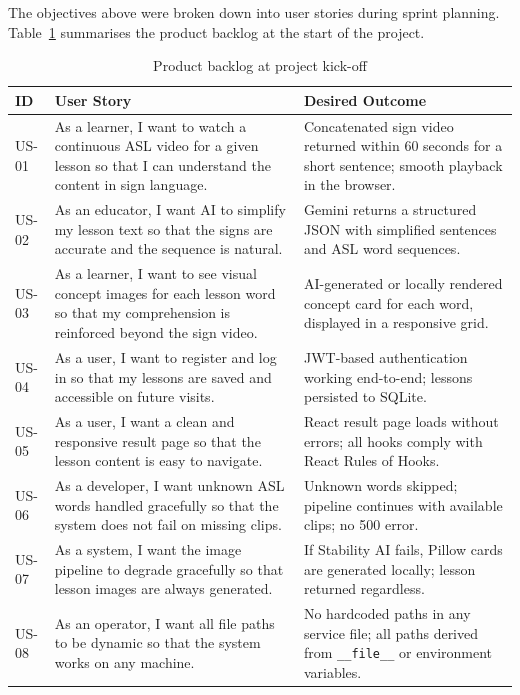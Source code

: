 \documentclass[12pt,a4paper,oneside]{report}
\begin{document}
The objectives above were broken down into user stories during sprint planning. Table~\ref{tab:backlog} summarises the product backlog at the start of the project.

\begin{table}[h]
\caption{Product backlog at project kick-off}
\label{tab:backlog}
\centering
\small
\begin{tabularx}{\linewidth}{@{}lXX@{}}
\toprule
\textbf{ID} & \textbf{User Story} & \textbf{Desired Outcome} \\
\midrule
US-01 & As a learner, I want to watch a continuous ASL video for a given lesson so that I can understand the content in sign language. & Concatenated sign video returned within 60 seconds for a short sentence; smooth playback in the browser. \\
US-02 & As an educator, I want AI to simplify my lesson text so that the signs are accurate and the sequence is natural. & Gemini returns a structured JSON with simplified sentences and ASL word sequences. \\
US-03 & As a learner, I want to see visual concept images for each lesson word so that my comprehension is reinforced beyond the sign video. & AI-generated or locally rendered concept card for each word, displayed in a responsive grid. \\
US-04 & As a user, I want to register and log in so that my lessons are saved and accessible on future visits. & JWT-based authentication working end-to-end; lessons persisted to SQLite. \\
US-05 & As a user, I want a clean and responsive result page so that the lesson content is easy to navigate. & React result page loads without errors; all hooks comply with React Rules of Hooks. \\
US-06 & As a developer, I want unknown ASL words handled gracefully so that the system does not fail on missing clips. & Unknown words skipped; pipeline continues with available clips; no 500 error. \\
US-07 & As a system, I want the image pipeline to degrade gracefully so that lesson images are always generated. & If Stability AI fails, Pillow cards are generated locally; lesson returned regardless. \\
US-08 & As an operator, I want all file paths to be dynamic so that the system works on any machine. & No hardcoded paths in any service file; all paths derived from \texttt{\_\_file\_\_} or environment variables. \\
\bottomrule
\end{tabularx}
\end{table}
\end{document}
